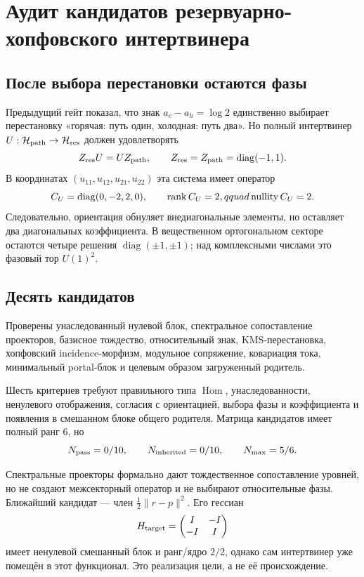 \chapter{Аудит кандидатов резервуарно-хопфовского интертвинера}
\label{ch:v10-hopf-reservoir-intertwiner-audit}

\section{После выбора перестановки остаются фазы}

Предыдущий гейт показал, что знак $a_c-a_h=\log2$ единственно выбирает
перестановку «горячая: путь один, холодная: путь два». Но полный
интертвинер $U:\mathcal H_{\rm path}\to\mathcal H_{\rm res}$ должен
удовлетворять
\begin{equation}
 Z_{\rm res}U=UZ_{\rm path},\qquad
 Z_{\rm res}=Z_{\rm path}=\operatorname{diag}(-1,1).
\end{equation}
В координатах $(u_{11},u_{12},u_{21},u_{22})$ эта система имеет оператор
\begin{equation}
 C_U=\operatorname{diag}(0,-2,2,0),\qquad
 \operatorname{rank} C_U=2,qquad \operatorname{nullity}C_U=2.
\end{equation}
Следовательно, ориентация обнуляет внедиагональные элементы, но оставляет
два диагональных коэффициента. В вещественном ортогональном секторе
остаются четыре решения $\operatorname{diag}(\pm1,\pm1)$; над комплексными
числами это фазовый тор $U(1)^2$.

\section{Десять кандидатов}

Проверены унаследованный нулевой блок, спектральное сопоставление
проекторов, базисное тождество, относительный знак, KMS-перестановка,
хопфовский incidence-морфизм, модульное сопряжение, ковариация тока,
минимальный portal-блок и целевым образом загруженный родитель.

Шесть критериев требуют правильного типа $\operatorname{Hom}$,
унаследованности, ненулевого отображения, согласия с ориентацией, выбора
фазы и коэффициента и появления в смешанном блоке общего родителя. Матрица
кандидатов имеет полный ранг $6$, но
\begin{equation}
 N_{\rm pass}=0/10,\qquad N_{\rm inherited}=0/10,
 \qquad N_{\rm max}=5/6.
\end{equation}

Спектральные проекторы формально дают тождественное сопоставление уровней,
но не создают межсекторный оператор и не выбирают относительные фазы.
Ближайший кандидат --- член $\frac12\|r-p\|^2$. Его гессиан
\begin{equation}
 H_{\rm target}=\begin{pmatrix}I&-I\\-I&I\end{pmatrix}
\end{equation}
имеет ненулевой смешанный блок и ранг/ядро $2/2$, однако сам интертвинер
уже помещён в этот функционал. Это реализация цели, а не её происхождение.


